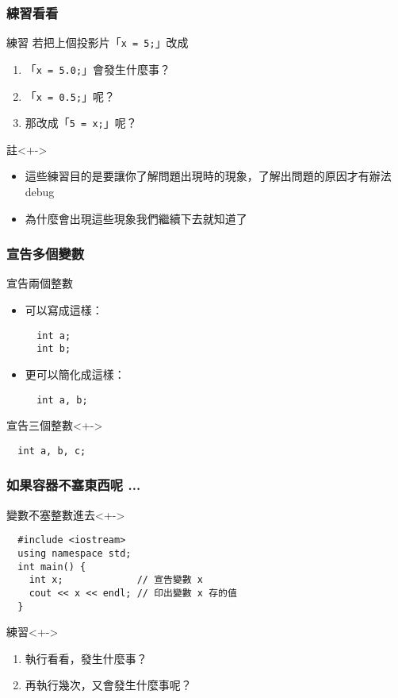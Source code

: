 \documentclass[utf8]{beamer}
\begin{document}
\begin{CJK}{UTF8}{bkai}
\begin{frame}
  \frametitle{練習看看}
  \begin{block}{練習}
    若把上個投影片「\lstinline{x = 5;}{}」改成
    \begin{enumerate}[<+->]
    \item 「\lstinline{x = 5.0;}{}」會發生什麼事？
    \item 「\lstinline{x = 0.5;}{}」呢？
    \item 那改成「\lstinline{5 = x;}{}」呢？
    \end{enumerate}
  \end{block}
  \begin{exampleblock}{註}<+->
    \begin{itemize}
      \item 這些練習目的是要讓你了解\alert{問題出現時}的現象，了解出問題的原因才有辦法 debug
      \item<+-> 為什麼會出現這些現象我們繼續下去就知道了
    \end{itemize}
  \end{exampleblock}
\end{frame}

\begin{frame}[fragile]
  \frametitle{宣告多個變數}
  \begin{exampleblock}{宣告兩個整數}
    \begin{itemize}[<+->]
    \item 可以寫成這樣：
      \begin{lstlisting}
  int a;
  int b;
      \end{lstlisting}
    \item 更可以簡化成這樣：
      \begin{lstlisting}
  int a, b;
      \end{lstlisting}
    \end{itemize}
  \end{exampleblock}
  \begin{exampleblock}{宣告三個整數}<+->
    \begin{lstlisting}
  int a, b, c;
    \end{lstlisting}
  \end{exampleblock}
\end{frame}

\begin{frame}[fragile]
  \frametitle{如果容器不塞東西呢 ...}
  \begin{block}{變數不塞整數進去}<+->
    \begin{lstlisting}
  #include <iostream>
  using namespace std;
  int main() {
    int x;             // 宣告變數 x
    cout << x << endl; // 印出變數 x 存的值
  }
    \end{lstlisting}
  \end{block}
  \begin{exampleblock}{練習}<+->
    \begin{enumerate}
    \item 執行看看，發生什麼事？
    \item<+-> 再執行幾次，又會發生什麼事呢？
    \end{enumerate}
  \end{exampleblock}
\end{frame}


\end{CJK}
\end{document}
